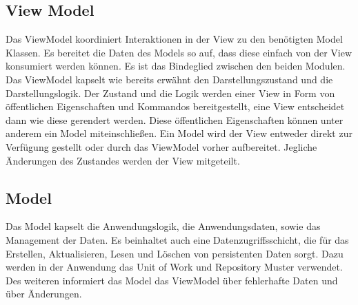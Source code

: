 \documentclass[13pt]{scrreprt}
\begin{document}
	\subsection{View Model}
	Das ViewModel koordiniert Interaktionen in der View zu den benötigten Model Klassen. Es bereitet die Daten des 		Models so auf, dass diese einfach von der View konsumiert werden können. Es ist das Bindeglied zwischen den 		beiden Modulen.
	\newline
	Das ViewModel kapselt wie bereits erwähnt den Darstellungszustand und die Darstellungslogik. Der Zustand und die 	Logik werden einer View in Form von \"offentlichen Eigenschaften und Kommandos bereitgestellt, eine View 			entscheidet dann wie diese gerendert werden. Diese \"offentlichen Eigenschaften k\"onnen unter anderem ein Model 	miteinschließen. Ein Model wird der View entweder direkt zur Verf\"ugung gestellt oder durch das ViewModel vorher 	aufbereitet. Jegliche \"Anderungen des Zustandes werden der View mitgeteilt.
	\subsection{Model}
	Das Model kapselt die Anwendungslogik, die Anwendungsdaten, sowie das Management der Daten. Es beinhaltet 		auch eine 	Datenzugriffsschicht, die für das Erstellen, Aktualisieren, Lesen und L\"oschen von persistenten Daten 		sorgt. Dazu werden in der Anwendung das Unit of Work und Repository Muster verwendet. Des weiteren informiert 		das 	Model das ViewModel über fehlerhafte Daten und über \"Anderungen.
\end{document}
